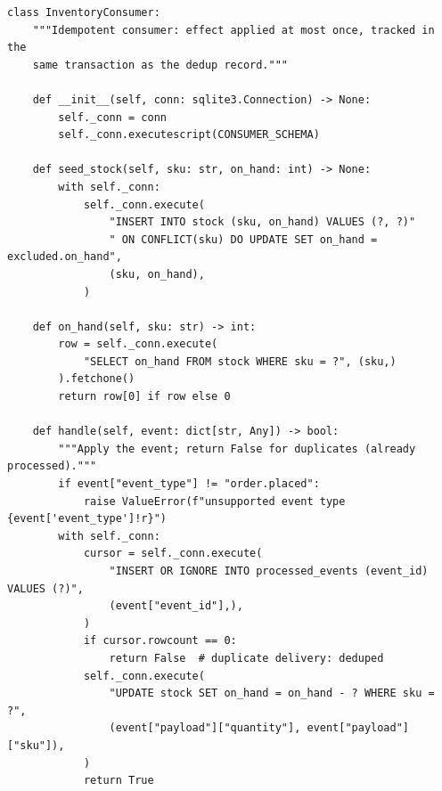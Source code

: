 \begin{verbatim}
class InventoryConsumer:
    """Idempotent consumer: effect applied at most once, tracked in the
    same transaction as the dedup record."""

    def __init__(self, conn: sqlite3.Connection) -> None:
        self._conn = conn
        self._conn.executescript(CONSUMER_SCHEMA)

    def seed_stock(self, sku: str, on_hand: int) -> None:
        with self._conn:
            self._conn.execute(
                "INSERT INTO stock (sku, on_hand) VALUES (?, ?)"
                " ON CONFLICT(sku) DO UPDATE SET on_hand = excluded.on_hand",
                (sku, on_hand),
            )

    def on_hand(self, sku: str) -> int:
        row = self._conn.execute(
            "SELECT on_hand FROM stock WHERE sku = ?", (sku,)
        ).fetchone()
        return row[0] if row else 0

    def handle(self, event: dict[str, Any]) -> bool:
        """Apply the event; return False for duplicates (already processed)."""
        if event["event_type"] != "order.placed":
            raise ValueError(f"unsupported event type {event['event_type']!r}")
        with self._conn:
            cursor = self._conn.execute(
                "INSERT OR IGNORE INTO processed_events (event_id) VALUES (?)",
                (event["event_id"],),
            )
            if cursor.rowcount == 0:
                return False  # duplicate delivery: deduped
            self._conn.execute(
                "UPDATE stock SET on_hand = on_hand - ? WHERE sku = ?",
                (event["payload"]["quantity"], event["payload"]["sku"]),
            )
            return True
\end{verbatim}


